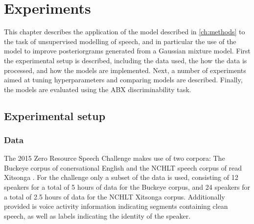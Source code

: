 %
%
%

\chapter{Experiments}
\label{ch:experiments}

This chapter describes the application of the model described in \cref{ch:methods} to the task of unsupervised modelling of speech, and in particular the use of the model to improve posteriorgrams generated from a Gaussian mixture model.
First the experimental setup is described, including the data used, the how the data is processed, and how the models are implemented.
Next, a number of experiments aimed at tuning hyperparameters and comparing models are described.
Finally, the models are evaluated using the ABX discriminability task.

\section{Experimental setup}
\subsection{Data}
The 2015 Zero Resource Speech Challenge makes use of two corpora: The Buckeye corpus of conersational English \parencite{buckeyecorpus} and the NCHLT speech corpus of read Xitsonga \parencite{barnard2014nchlt}.
For the challenge only a subset of the data is used, consisting of 12 speakers for a total of 5 hours of data for the Buckeye corpus, and 24 speakers for a total of 2.5 hours of data for the NCHLT Xitsonga corpus.
Additionally provided is voice activity information indicating segments containing clean speech, as well as labels indicating the identity of the speaker.

